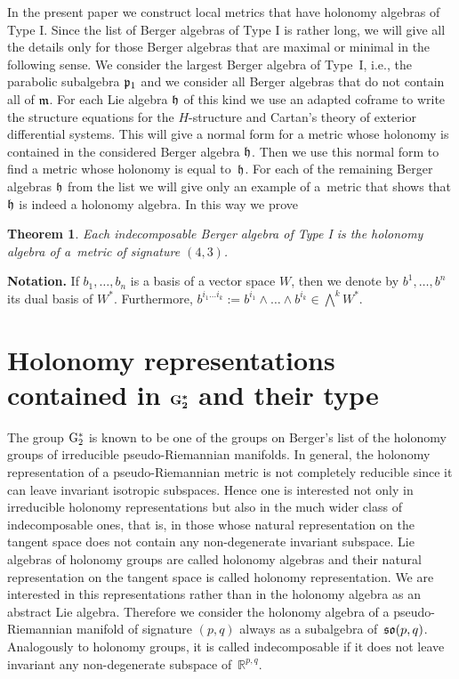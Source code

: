 \documentclass[pdftex]{sigma}
\numberwithin{equation}{section}
\newtheorem{Theorem}{Theorem}[section]
\newcommand\fh{{\frak h}}
\newcommand\fm{{\frak m}}
\newcommand{\fso}{\mathop{{\frak s \frak o}}}
\newcommand\RR{{\mathbb R}}
\newcommand{\G}{\mathop{{{\rm G}_{2}^*}}}
\begin{document}
In the present paper we construct local metrics that have holonomy algebras of Type I. Since the list of Berger algebras of Type I is rather long, we will give all the details only for those Berger algebras that are maximal or minimal in the following sense. We consider the largest Berger algebra of Type~I, i.e., the parabolic subalgebra $\frak p_1$ and we consider all Berger algebras that do not contain all of $\fm$. For each Lie algebra $\fh$ of this kind we use an adapted coframe to write the structure equations for the $H$-structure and Cartan's theory of exterior differential systems. This will give a normal form for a metric whose holonomy is contained in the considered Berger algebra $\fh$. Then we use this normal form to find a metric whose holonomy is equal to~$\fh$. For each of the remaining Berger algebras $\fh$ from the list we will give only an example of a~metric that shows that $\fh$ is indeed a holonomy algebra. In this way we prove
\begin{Theorem}\label{T}
Each indecomposable Berger algebra of Type I is the holonomy algebra of a~metric of signature $(4,3)$.
\end{Theorem}

\noindent
{\bf Notation.} If $b_1,\dots,b_n$ is a basis of a vector space $W$, then we denote by $b^1,\dots,b^n$ its dual basis of $W^*$. Furthermore, $b^{i_1\dots i_k}:=b^{i_1}\wedge\dots\wedge b^{i_k}\in\bigwedge^k W^*$.

\section[Holonomy representations contained in $\G$ and their type]{Holonomy representations contained in $\boldsymbol{\G}$ and their type}

The group $\G$ is known to be one of the groups on Berger's list of the holonomy groups of irreducible pseudo-Riemannian manifolds. In general, the holonomy representation of a pseudo-Riemannian metric is not completely reducible since it can leave invariant isotropic subspaces. Hence one is interested not only in irreducible holonomy representations but also in the much wider class of indecomposable ones, that is, in those whose natural representation on the tangent space does not contain any non-degenerate invariant subspace. Lie algebras of holonomy groups are called holonomy algebras and their natural representation on the tangent space is called holonomy representation. We are interested in this representations rather than in the holonomy algebra as an abstract Lie algebra. Therefore we consider the holonomy algebra of a pseudo-Riemannian manifold of signature $(p,q)$ always as a subalgebra of~$\fso(p,q)$. Analogously to holonomy groups, it is called indecomposable if it does not leave invariant any non-degenerate subspace of~$\RR^{p,q}$.
\end{document}

